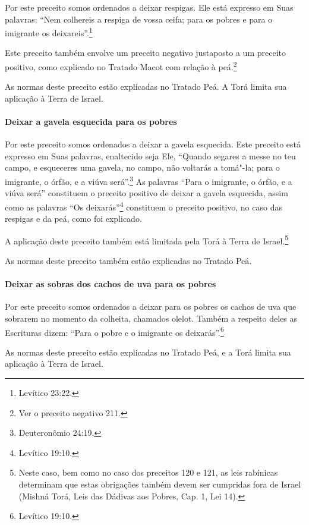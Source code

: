 \begin{multicols}{2}
Por este preceito somos ordenados a deixar respigas. Ele está expresso
em Suas palavras: ``Nem colhereis a respiga de vossa ceifa; para os
pobres e para o imigrante os deixareis''.\footnote{Levítico 23:22.}

Este preceito também envolve um preceito negativo justaposto a um
preceito positivo, como explicado no Tratado Macot\starr{} com relação à
peá\starr.\footnote{Ver o preceito negativo 211.}


As normas deste preceito estão explicadas no Tratado Peá\starr. A Torá\starr{} limita
sua aplicação à Terra de Israel.

\paragraph{Deixar a gavela esquecida para os pobres}

Por este preceito somos ordenados a deixar a gavela esquecida. Este
preceito está expresso em Suas palavras, enaltecido seja Ele, ``Quando
segares a messe no teu campo, e esqueceres uma gavela, no campo, não
voltarás a tomá"-la; para o imigrante, o órfão, e a viúva será''.\footnote{Deuteronômio 24:19.} As palavras ``Para o imigrante, o órfão, e a viúva
será'' constituem o preceito positivo de
deixar a gavela esquecida, assim como as palavras ``Os deixarás''\footnote{Levítico 19:10.} constituem o preceito positivo, no caso das respigas e da peá\starr, como
foi explicado.

A aplicação deste preceito também está limitada pela Torá\starr{} à Terra de Israel.\footnote{Neste caso, bem como no caso dos preceitos 120 e 121, as leis
  rabínicas determinam que estas obrigações também devem ser cumpridas
  fora de Israel (Mishná\starr{} Torá\starr, Leis das Dádivas aos Pobres, Cap. 1,
  Lei 14).}

As normas deste preceito também estão explicadas no Tratado Peá\starr.

\paragraph{Deixar as sobras dos cachos de uva para os pobres}

Por este preceito somos ordenados a deixar para os pobres os cachos de
uva que sobrarem no momento da colheita, chamados olelot\starr. Também a
respeito deles as Escrituras dizem: ``Para o pobre e o imigrante os
deixarás''.\footnote{Levítico 19:10.}

As normas deste preceito estão explicadas no Tratado Peá\starr, e a Torá\starr{}
limita sua aplicação à Terra de Israel.


\end{multicols}
